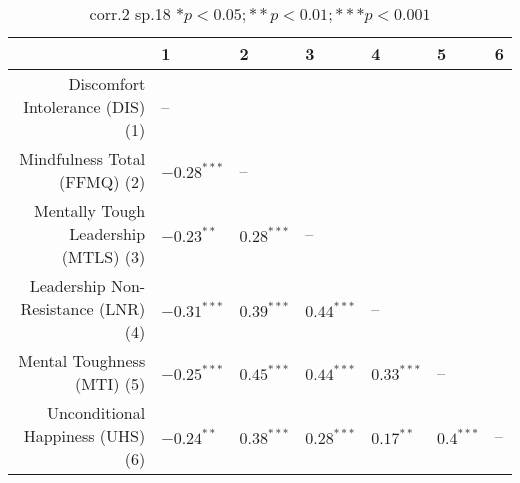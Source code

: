 \begin{table}[ht]
\centering
\begin{tabular}{rllllll}
  \hline
 & 1 & 2 & 3 & 4 & 5 & 6 \\ 
  \hline
Discomfort Intolerance (DIS) (1) & -- &  &  &  &  &  \\ 
  Mindfulness Total (FFMQ) (2) & $-0.28^{***}$ & -- &  &  &  &  \\ 
  Mentally Tough Leadership (MTLS) (3) & $-0.23^{**}$ & $0.28^{***}$ & -- &  &  &  \\ 
  Leadership Non-Resistance (LNR) (4) & $-0.31^{***}$ & $0.39^{***}$ & $0.44^{***}$ & -- &  &  \\ 
  Mental Toughness (MTI) (5) & $-0.25^{***}$ & $0.45^{***}$ & $0.44^{***}$ & $0.33^{***}$ & -- &  \\ 
  Unconditional Happiness (UHS) (6) & $-0.24^{**}$ & $0.38^{***}$ & $0.28^{***}$ & $0.17^{**}$ & $0.4^{***}$ & -- \\ 
   \hline
\end{tabular}
\caption{corr.2 sp.18 $* p < 0.05; ** p < 0.01; *** p < 0.001$} 
\label{freq_corr.corr.2.sp.18}
\end{table}

